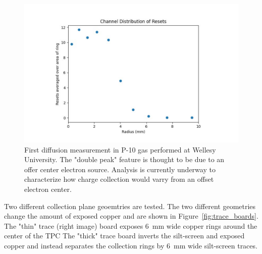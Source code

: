 \begin{figure}[]
\centering
\includegraphics[width=\textwidth]{images/SAQ_first_diffusion_measurement.pdf}
\caption{First diffusion measurement in P-10 gas performed at Wellesy University.
The "double peak" feature is thought to be due to an offer center electron source.
Analysis is currently underway to characterize how charge collection would varry from an offset electron center.
}
\label{fig:saq_first_diffusion_measurement}
\end{figure}

Two different collection plane geoemtries are tested.
The two different geometries change the amount of exposed copper and are shown in Figure~\ref{fig:trace_boards}.
The "thin" trace (right image) board exposes 6~\unit{mm} wide copper rings around the center of the TPC
The "thick" trace board inverts the silt-screen and exposed copper and instead separates the collection rings by 6~\unit{mm} wide silt-screen traces.


